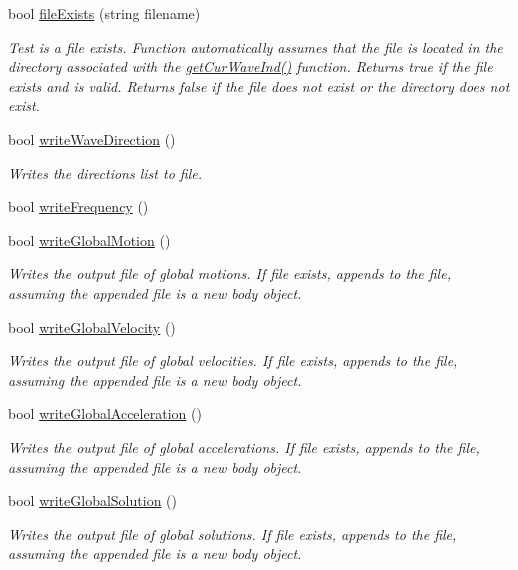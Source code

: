 \begin{DoxyCompactItemize}
bool \hyperlink{class_file_writer_a268a7349181f2d8c739a0809ba0eede2}{file\-Exists} (string filename)
\begin{DoxyCompactList}\small\item\em Test is a file exists. Function automatically assumes that the file is located in the directory associated with the \hyperlink{class_file_writer_a9748d987475a225b49e14f48b8be0cd6}{get\-Cur\-Wave\-Ind()} function. Returns true if the file exists and is valid. Returns false if the file does not exist or the directory does not exist. \end{DoxyCompactList}\item 
bool \hyperlink{class_file_writer_a0428a4f8ad72d01ff5316bfa3e4ce631}{write\-Wave\-Direction} ()
\begin{DoxyCompactList}\small\item\em Writes the directions list to file. \end{DoxyCompactList}\item 
bool \hyperlink{class_file_writer_ac6df31af71020a41adb6ecd6ff136532}{write\-Frequency} ()
\item 
bool \hyperlink{class_file_writer_a5c921b5ae92039cf50458e2c46e204da}{write\-Global\-Motion} ()
\begin{DoxyCompactList}\small\item\em Writes the output file of global motions. If file exists, appends to the file, assuming the appended file is a new body object. \end{DoxyCompactList}\item 
bool \hyperlink{class_file_writer_a2078a50dbd21946aeed86d8e0bccd50e}{write\-Global\-Velocity} ()
\begin{DoxyCompactList}\small\item\em Writes the output file of global velocities. If file exists, appends to the file, assuming the appended file is a new body object. \end{DoxyCompactList}\item 
bool \hyperlink{class_file_writer_aaff553c2e03cb1c1639e107cfeac3038}{write\-Global\-Acceleration} ()
\begin{DoxyCompactList}\small\item\em Writes the output file of global accelerations. If file exists, appends to the file, assuming the appended file is a new body object. \end{DoxyCompactList}\item 
bool \hyperlink{class_file_writer_a317649499b8c16dd529e2bf588e3be88}{write\-Global\-Solution} ()
\begin{DoxyCompactList}\small\item\em Writes the output file of global solutions. If file exists, appends to the file, assuming the appended file is a new body object. \end{DoxyCompactList}\end{DoxyCompactItemize}
